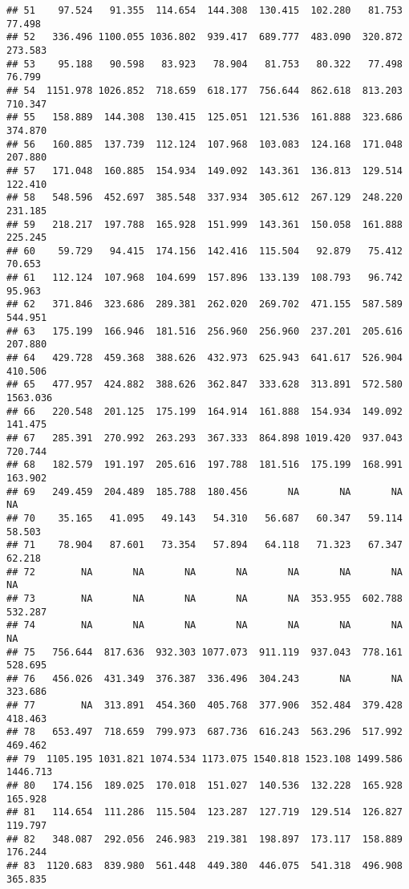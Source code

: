 \documentclass[
]{article}
\begin{document}
\begin{verbatim}
## 51    97.524   91.355  114.654  144.308  130.415  102.280   81.753   77.498
## 52   336.496 1100.055 1036.802  939.417  689.777  483.090  320.872  273.583
## 53    95.188   90.598   83.923   78.904   81.753   80.322   77.498   76.799
## 54  1151.978 1026.852  718.659  618.177  756.644  862.618  813.203  710.347
## 55   158.889  144.308  130.415  125.051  121.536  161.888  323.686  374.870
## 56   160.885  137.739  112.124  107.968  103.083  124.168  171.048  207.880
## 57   171.048  160.885  154.934  149.092  143.361  136.813  129.514  122.410
## 58   548.596  452.697  385.548  337.934  305.612  267.129  248.220  231.185
## 59   218.217  197.788  165.928  151.999  143.361  150.058  161.888  225.245
## 60    59.729   94.415  174.156  142.416  115.504   92.879   75.412   70.653
## 61   112.124  107.968  104.699  157.896  133.139  108.793   96.742   95.963
## 62   371.846  323.686  289.381  262.020  269.702  471.155  587.589  544.951
## 63   175.199  166.946  181.516  256.960  256.960  237.201  205.616  207.880
## 64   429.728  459.368  388.626  432.973  625.943  641.617  526.904  410.506
## 65   477.957  424.882  388.626  362.847  333.628  313.891  572.580 1563.036
## 66   220.548  201.125  175.199  164.914  161.888  154.934  149.092  141.475
## 67   285.391  270.992  263.293  367.333  864.898 1019.420  937.043  720.744
## 68   182.579  191.197  205.616  197.788  181.516  175.199  168.991  163.902
## 69   249.459  204.489  185.788  180.456       NA       NA       NA       NA
## 70    35.165   41.095   49.143   54.310   56.687   60.347   59.114   58.503
## 71    78.904   87.601   73.354   57.894   64.118   71.323   67.347   62.218
## 72        NA       NA       NA       NA       NA       NA       NA       NA
## 73        NA       NA       NA       NA       NA  353.955  602.788  532.287
## 74        NA       NA       NA       NA       NA       NA       NA       NA
## 75   756.644  817.636  932.303 1077.073  911.119  937.043  778.161  528.695
## 76   456.026  431.349  376.387  336.496  304.243       NA       NA  323.686
## 77        NA  313.891  454.360  405.768  377.906  352.484  379.428  418.463
## 78   653.497  718.659  799.973  687.736  616.243  563.296  517.992  469.462
## 79  1105.195 1031.821 1074.534 1173.075 1540.818 1523.108 1499.586 1446.713
## 80   174.156  189.025  170.018  151.027  140.536  132.228  165.928  165.928
## 81   114.654  111.286  115.504  123.287  127.719  129.514  126.827  119.797
## 82   348.087  292.056  246.983  219.381  198.897  173.117  158.889  176.244
## 83  1120.683  839.980  561.448  449.380  446.075  541.318  496.908  365.835

\end{verbatim}
\end{document}
